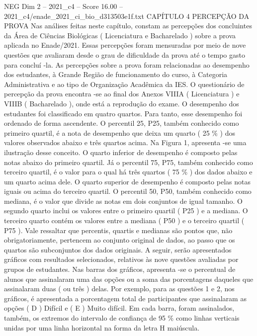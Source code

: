 \begin{textsample}{NEG Dim 2 – 2021\_c4 – Score 16.00 – 2021\_c4/enade\_2021\_ci\_bio\_d313503e1f.txt}  \label{ex:f2_neg_398}
CAPÍTULO 4 PERCEPÇÃO DA PROVA Nas análises feitas neste capítulo, constam as percepções dos concluintes da Área de Ciências Biológicas ( Licenciatura e Bacharelado ) sobre a prova aplicada no Enade/2021.
Essas percepções foram mensuradas por meio de nove questões que avaliaram desde o grau de dificuldade da prova até o tempo gasto para concluí -la.
As percepções sobre a prova foram relacionadas ao desempenho dos estudantes, à Grande Região de funcionamento do curso, à Categoria Administrativa e ao tipo de Organização Acadêmica da IES.
O questionário de percepção da prova encontra -se ao final dos Anexos VIIIA ( Licenciatura ) e VIIIB ( Bacharelado ), onde está a reprodução do exame.
O desempenho dos estudantes foi classificado em quatro quartos.
Para tanto, esse desempenho foi ordenado de forma ascendente.
O percentil 25, P25, também conhecido como primeiro quartil, é a nota de desempenho que deixa um quarto ( 25 \% ) dos valores observados abaixo e três quartos acima.
Na Figura 1, apresenta -se uma ilustração desse conceito.
O quarto inferior de desempenho é composto pelas notas abaixo do primeiro quartil.
Já o percentil 75, P75, também conhecido como terceiro quartil, é o valor para o qual há três quartos ( 75 \% ) dos dados abaixo e um quarto acima dele.
O quarto superior de desempenho é composto pelas notas iguais ou acima do terceiro quartil.
O percentil 50, P50, também conhecido como mediana, é o valor que divide as notas em dois conjuntos de igual tamanho.
O segundo quarto inclui os valores entre o primeiro quartil ( P25 ) e a mediana.
O terceiro quarto contém os valores entre a mediana ( P50 ) e o terceiro quartil ( P75 ).
Vale ressaltar que percentis, quartis e medianas são pontos que, não obrigatoriamente, pertencem ao conjunto original de dados, ao passo que os quartos são subconjuntos dos dados originais.
A seguir, serão apresentados gráficos com resultados selecionados, relativos às nove questões avaliadas por grupos de estudantes.
Nas barras dos gráficos, apresenta -se o percentual de alunos que assinalaram uma das opções ou a soma das porcentagens daqueles que assinalaram duas ( ou três ) delas.
Por exemplo, para as questões 1 e 2, nos gráficos, é apresentada a porcentagem total de participantes que assinalaram as opções ( D ) Difícil e ( E ) Muito difícil.
Em cada barra, foram assinalados, também, os extremos do intervalo de confiança de 95 \% como linhas verticais unidas por uma linha horizontal na forma da letra H maiúscula.

\end{textsample}
